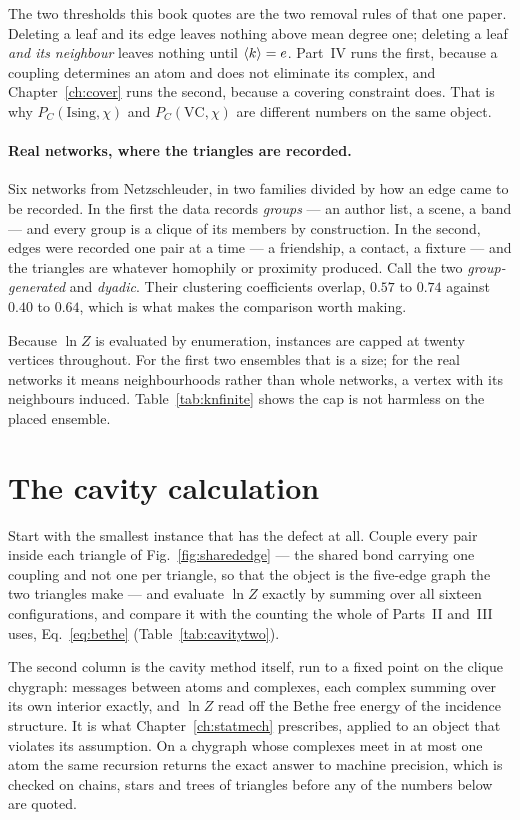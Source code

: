 The two thresholds this book quotes are the two removal rules of that one paper.
Deleting a leaf and its edge leaves nothing above mean degree one; deleting a
leaf \emph{and its neighbour} leaves nothing until $\langle k \rangle=e$. Part~IV runs
the first, because a coupling determines an atom and does not eliminate its
complex, and Chapter~\ref{ch:cover} runs the second, because a covering
constraint does. That is why $P_{C}(\mathrm{Ising},\chi)$ and
$P_{C}(\mathrm{VC},\chi)$ are different numbers on the same
object.

\paragraph{Real networks, where the triangles are recorded.} Six
networks from Netzschleuder, in two families divided by how an edge came to be
recorded. In the first the data records \emph{groups} --- an author list, a
scene, a band --- and every group is a clique of its members by construction. In
the second, edges were recorded one pair at a time --- a friendship, a contact,
a fixture --- and the triangles are whatever homophily or proximity produced.
Call the two \emph{group-generated} and \emph{dyadic}. Their clustering
coefficients overlap, $0.57$ to $0.74$ against $0.40$ to $0.64$, which is what
makes the comparison worth making.

Because $\ln Z$ is evaluated by enumeration, instances are capped at twenty
vertices throughout. For the first two ensembles that is a size; for the real
networks it means neighbourhoods rather than whole networks, a vertex with its
neighbours induced. Table~\ref{tab:knfinite} shows the cap is not harmless on
the placed ensemble.

\section{The cavity calculation}
\label{sec:cavityfail}

Start with the smallest instance that has the defect at all. Couple every pair
inside each triangle of Fig.~\ref{fig:sharededge} --- the shared bond carrying
one coupling and not one per triangle, so that the object is the five-edge graph
the two triangles make --- and evaluate $\ln Z$ exactly by summing over all
sixteen configurations, and compare it with the counting the whole of Parts~II
and~III uses, Eq.~\eqref{eq:bethe} (Table~\ref{tab:cavitytwo}).

The second column is the cavity method itself, run to a fixed point on the
clique chygraph: messages between atoms and complexes, each complex summing over
its own interior exactly, and $\ln Z$ read off the Bethe free energy of the
incidence structure. It is what Chapter~\ref{ch:statmech} prescribes, applied to
an object that violates its assumption. On a chygraph whose complexes meet in at
most one atom the same recursion returns the exact answer to machine precision,
which is checked on chains, stars and trees of triangles before any of the
numbers below are quoted.


